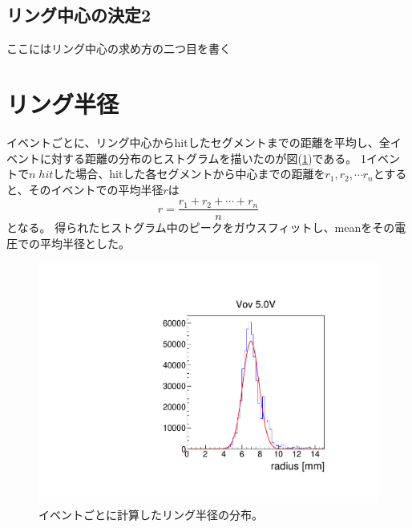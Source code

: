 \documentclass[uplatex, titlepage, dvipdfmx, 12pt, a4paper]{jsreport}
\begin{document}
    \subsection{リング中心の決定2}
      ここにはリング中心の求め方の二つ目を書く
    \section{リング半径}
    イベントごとに、リング中心からhitしたセグメントまでの距離を平均し、全イベントに対する距離の分布のヒストグラムを描いたのが図(\ref{fig:5Vradius})である。
    1イベントで$n\;\si{hit}$した場合、hitした各セグメントから中心までの距離を$r_1, r_2, \cdots r_n$とすると、そのイベントでの平均半径$r$は
    \begin{equation}
      r = \frac{r_1 + r_2 + \cdots + r_n}{n} \nonumber
    \end{equation}
    となる。
    得られたヒストグラム中のピークをガウスフィットし、meanをその電圧での平均半径とした。
    \begin{figure}[hbtp]
      \begin{center} 
        \includegraphics[scale=0.5, clip]{image/radius.pdf}
        \caption{イベントごとに計算したリング半径の分布。} 
        \label{fig:5Vradius} 
      \end{center}
    \end{figure}
    
    
    
\end{document}
